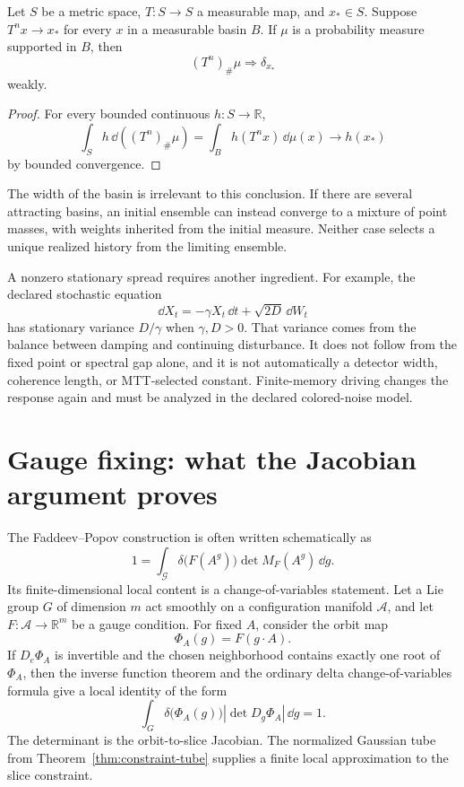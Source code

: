 \documentclass[11pt]{article}
\begin{document}
\begin{proposition}
\label{prop:fixed-point-delta}
Let \(S\) be a metric space, \(T:S\to S\) a measurable map, and \(x_\ast\in S\).
Suppose \(T^n x\to x_\ast\) for every \(x\) in a measurable basin \(B\). If
\(\mu\) is a probability measure supported in \(B\), then
\[
(T^n)_\#\mu\Longrightarrow\delta_{x_\ast}
\]
weakly.
\end{proposition}

\begin{proof}
For every bounded continuous \(h:S\to\mathbb R\),
\[
\int_S h\,\dd((T^n)_\#\mu)
=
\int_B h(T^n x)\,\dd\mu(x)
\longrightarrow
h(x_\ast)
\]
by bounded convergence.
\end{proof}

The width of the basin is irrelevant to this conclusion. If there are several
attracting basins, an initial ensemble can instead converge to a mixture of
point masses, with weights inherited from the initial measure. Neither case
selects a unique realized history from the limiting ensemble.

A nonzero stationary spread requires another ingredient. For example, the
declared stochastic equation
\[
\dd X_t=-\gamma X_t\,\dd t+\sqrt{2D}\,\dd W_t
\]
has stationary variance \(D/\gamma\) when \(\gamma,D>0\). That variance comes
from the balance between damping and continuing disturbance. It does not
follow from the fixed point or spectral gap alone, and it is not automatically
a detector width, coherence length, or MTT-selected constant. Finite-memory
driving changes the response again and must be analyzed in the declared
colored-noise model.

\section{Gauge fixing: what the Jacobian argument proves}

The Faddeev--Popov construction is often written schematically as
\[
1=
\int_{\mathcal G}
\delta\!\bigl(F(A^g)\bigr)
\det M_F(A^g)\,\dd g.
\]
Its finite-dimensional local content is a change-of-variables statement. Let
a Lie group \(G\) of dimension \(m\) act smoothly on a configuration manifold
\(\mathcal A\), and let \(F:\mathcal A\to\mathbb R^m\) be a gauge condition.
For fixed \(A\), consider the orbit map
\[
\Phi_A(g)=F(g\cdot A).
\]
If \(D_e\Phi_A\) is invertible and the chosen neighborhood contains exactly
one root of \(\Phi_A\), then the inverse function theorem and the ordinary
delta change-of-variables formula give a local identity of the form
\[
\int_G
\delta\!\bigl(\Phi_A(g)\bigr)
\left|\det D_g\Phi_A\right|
\,\dd g
=1.
\]
The determinant is the orbit-to-slice Jacobian. The normalized Gaussian tube
from Theorem~\ref{thm:constraint-tube} supplies a finite local approximation
to the slice constraint.
\end{document}
